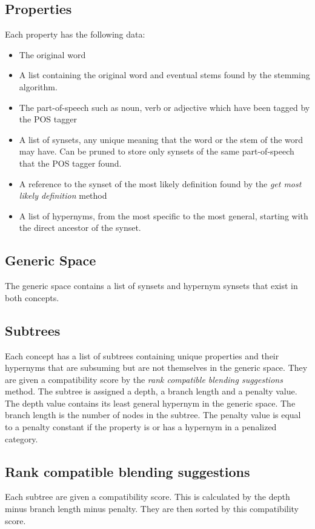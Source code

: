 \subsection{Properties}
Each property has the following data:
\begin{itemize}
\item The original word
\item A list containing the original word and eventual stems found by the stemming algorithm.
\item The part-of-speech such as noun, verb or adjective which have been tagged by the POS tagger
\item A list of synsets, any unique meaning that the word or the stem of the word may have. Can be pruned to store only synsets of the same part-of-speech that the POS tagger found.
\item A reference to the synset of the most likely definition found by the \emph{get most likely definition} method
\item A list of hypernyms, from the most specific to the most general, starting with the direct ancestor of the synset.
\end{itemize}

\subsection{Generic Space}
The generic space contains a list of synsets and hypernym synsets that exist in both concepts.

\subsection{Subtrees}
Each concept has a list of subtrees containing unique properties and their hypernyms that are subsuming but are not themselves in the generic space. They are given a compatibility score by the \emph{rank compatible blending suggestions} method. The subtree is assigned a depth, a branch length and a penalty value. The depth value contains its least general hypernym in the generic space.
The branch length is the number of nodes in the subtree. The penalty value is equal to a penalty constant if the property is or has a hypernym in a penalized category.

\subsection{Rank compatible blending suggestions}
Each subtree are given a compatibility score. This is calculated by the depth minus branch length minus penalty. They are then sorted by this compatibility score.

